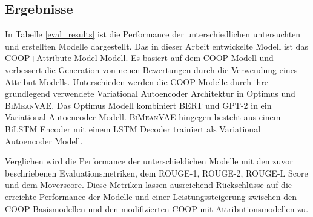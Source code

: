 


\subsection{Ergebnisse}
In Tabelle \ref{eval_results} ist die Performance der unterschiedlichen untersuchten und erstellten Modelle dargestellt.
Das in dieser Arbeit entwickelte Modell ist das \glqq COOP+Attribute Model\grqq{} Modell.
Es basiert auf dem COOP Modell und verbessert die Generation von neuen Bewertungen durch die Verwendung eines Attribut-Modells.
Unterschieden werden die COOP Modelle durch ihre grundlegend verwendete Variational Autoencoder Architektur in Optimus und \textsc{BiMeanVAE}.
Das Optimus Modell kombiniert BERT und GPT-2 in ein Variational Autoencoder Modell. \textsc{BiMeanVAE} hingegen besteht aus einem BiLSTM Encoder mit einem LSTM Decoder trainiert als Variational Autoencoder Modell.

Verglichen wird die Performance der unterschieldichen Modelle mit den zuvor beschriebenen Evaluationsmetriken, dem ROUGE-1, ROUGE-2, ROUGE-L Score und dem Moverscore.
Diese Metriken lassen ausreichend Rückschlüsse auf die erreichte Performance der Modelle und einer Leistungssteigerung zwischen den COOP Basismodellen und den modifizierten COOP mit Attributionsmodellen zu.

